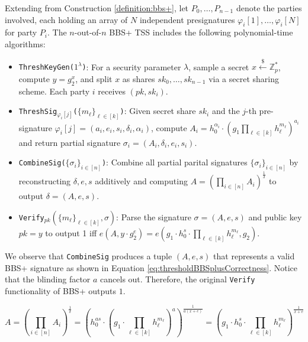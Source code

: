 \begin{construction}
\label{construction:noutofnTRBBSPlus}
Extending from Construction \ref{definition:bbs+}, let $P_0, \ldots, P_{n-1}$ denote the parties involved, each holding an array of $N$ independent presignatures $\varphi_{i}[1], \ldots, \varphi_{i}[N]$ for party $P_i$. The $n$-out-of-$n$ BBS+ TSS includes the following polynomial-time algorithms:
\begin{itemize}
    \item \texttt{\textup{ThreshKeyGen($1^\lambda$)}}: For a security parameter $\lambda$, sample a secret $x \stackrel{\$}{\leftarrow} \mathbb{Z}_p^*$, compute $y = g_2^x$, and split $x$ as shares ${sk_0, \ldots, sk_{n-1}}$ via a secret sharing scheme. Each party $i$ receives $(pk, sk_i)$.
    \item \texttt{\textup{ThreshSig$_{\varphi_{i}[j]}$($\{m_{\ell}\}_{\ell \in [k]}$)}}: Given secret share $sk_i$ and the \(j\)-th pre-signature $\varphi_{i}[j] = (a_i,e_i,s_i,\delta_i,\alpha_i)$, compute $A_i = h_0^{\alpha_i} \cdot \left( g_1\prod_{\ell \in [k]} h_{\ell}^{m_{\ell}} \right)^{a_i}$ and return partial signature $\sigma_i = (A_i, \delta_i, e_i, s_i)$.
    
    \item \texttt{\textup{CombineSig($\{\sigma_{i}\}_{i \in [n]}$)}}: Combine all partial parital signatures $\{\sigma_{i}\}_{i \in [n]}$ by reconstructing $\delta, e, s$ additively and computing $A = (\prod_{i \in [n]} A_i)^{\frac{1}{\delta}}$ to output $\delta = (A, e, s)$.
    
    \item \texttt{\textup{Verify}}$_{pk}$$(\{m_{\ell}\}_{\ell \in [k]}, \sigma)$: Parse the signature $\sigma = (A, e, s)$ and public key $pk = y$ to output 1 iff $e(A, y \cdot g_2^e) = e(g_1\cdot h_0^s \cdot \prod_{\ell \in [k]} h_{\ell}^{m_{\ell}}, g_2)$.
\end{itemize}
\end{construction}

We observe that \texttt{\textup{CombineSig}} produces a tuple $(A, e, s)$ that represents a valid BBS+ signature as shown in Equation \ref{eq:thresholdBBSplusCorrectness}. Notice that the blinding factor $a$ cancels out. Therefore, the original \texttt{\textup{Verify}} functionality of BBS+ outputs $1$.

\begin{equation}
    A = (\prod_{i \in [n]} A_i)^{\frac{1}{\delta}} = \left( h_0^{as}\cdot (g_1\cdot \prod_{\ell \in [k]} h_{\ell}^{m_{\ell}})^a \right)^{\frac{1}{a(x+e)}} = \left( g_1\cdot h_0^{s}\cdot \prod_{\ell \in [k]} h_{\ell}^{m_{\ell}} \right)^{\frac{1}{x+e}}
\label{eq:thresholdBBSplusCorrectness}  
\end{equation}

